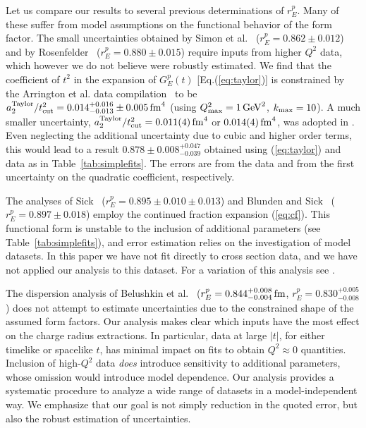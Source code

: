 \documentclass[12pt]{article}
\begin{document}
Let us compare our results to several previous determinations of $r_E^p$.   
Many of these suffer from model assumptions on the 
functional behavior of the form factor.   
The small uncertainties obtained by Simon et al.~\cite{Simon:1980hu} ($r_E^p=0.862\pm 0.012$) 
and by Rosenfelder~\cite{Rosenfelder:1999cd} ($r_E^p=0.880\pm 0.015$)
require inputs from higher $Q^2$ data, which however we do not believe were robustly estimated.     
We find that the coefficient of $t^2$ 
in the expansion of $G_E^p(t)$ [Eq.(\ref{eq:taylor})] is constrained by the Arrington et al. data 
compilation~\cite{Arrington:2007ux} to be 
$a_2^{\rm Taylor}/t_{\rm cut}^2 = 0.014^{+0.016}_{-0.013} \pm 0.005 \,{\rm fm}^4$ (using $Q^2_{\rm max}=1\,{\rm GeV}^2$, 
$k_{\rm max}=10$).   
A much smaller uncertainty, $a_2^{\rm Taylor}/t_{\rm cut}^2 = 0.011(4)\,{\rm fm}^4$ or $0.014(4)\,{\rm fm}^4$, 
was adopted in \cite{Rosenfelder:1999cd}.   
Even neglecting the additional uncertainty due to 
cubic and higher order terms, this would lead to a result 
$0.878\pm 0.008^{+0.047}_{-0.039}$ obtained using (\ref{eq:taylor}) and data as in Table~\ref{tab:simplefits}.  
The errors are from the data and from the first uncertainty 
on the quadratic coefficient, respectively.

The analyses of 
Sick~\cite{Sick:2003gm} ($r_E^p=0.895\pm 0.010\pm 0.013$) 
and 
Blunden and Sick~\cite{Blunden:2005jv} ($r_E^p=0.897\pm 0.018$) 
employ the continued fraction expansion (\ref{eq:cf}).   This functional form is unstable to 
the inclusion of additional parameters (see Table~\ref{tab:simplefits}), and error estimation relies 
on the investigation of model datasets.   
In this paper we have not fit directly to cross section data,
and we have not applied our analysis to this dataset. For a variation of this analysis see \cite{Borisyuk:2009mg}.

The dispersion analysis of Belushkin et al.~\cite{Belushkin:2006qa} 
($r_E^p=0.844^{+0.008}_{-0.004}\,{\rm fm}$, $r_E^p=0.830^{+0.005}_{-0.008}$) 
does not attempt to estimate uncertainties due to the constrained shape of
the assumed form factors.   
Our analysis makes clear which inputs have the most 
effect on the charge radius extractions.  In particular, data at large $|t|$, 
for either timelike or spacelike $t$, has minimal impact on fits to obtain 
$Q^2\approx 0$ quantities.   Inclusion of high-$Q^2$ data {\it does} 
introduce sensitivity to additional parameters, whose omission would introduce 
model dependence.   Our analysis provides a systematic procedure to analyze a wide
range of datasets in a model-independent way.   We emphasize that our goal is not 
simply reduction in the quoted error, but also the robust estimation of uncertainties.
\end{document}
